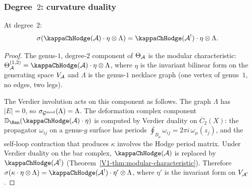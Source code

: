 \subsubsection{Degree~$2$: curvature duality}

\begin{proposition}
\label{prop:thqg-IV-kappa-duality}
At degree~$2$:
\begin{equation}%
\sigma(\kappaChHodge(\cA) \cdot \eta \otimes \Lambda)
= \kappaChHodge(\cA^!) \cdot \eta \otimes \Lambda.
\end{equation}
\end{proposition}

\begin{proof}
The genus-$1$, degree-$2$ component of $\Theta_{\mathcal{A}}$ is the modular
characteristic:
$\Theta_\cA^{(1,2)} = \kappaChHodge(\cA) \cdot \eta \otimes \Lambda$,
where $\eta$ is the invariant bilinear form on the generating
space $V_{\mathcal{A}}$ and $\Lambda$ is the genus-$1$ necklace graph
(one vertex of genus~$1$, no edges, two legs).

The Verdier involution acts on this component as follows.
The graph $\Lambda$ has $|E| = 0$, so
$\sigma_{\mathcal{G}^{\mathrm{mod}}}(\Lambda) = \Lambda$.
The deformation complex component $\VD_{\Ran}(\kappaChHodge(\cA) \cdot \eta)$
is computed by Verdier duality on $\overline{C}_2(X)$:
the propagator $\omega_{ij}$ on a genus-$g$ surface has periods
$\oint_{B_\mu} \omega_{ij} = 2\pi i\,\omega_\mu(z_j)$, and the
self-loop contraction that produces $\kappa$ involves the Hodge period
matrix. Under Verdier duality on the bar complex,
$\kappaChHodge(\cA)$ is replaced by $\kappaChHodge(\cA^!)$
(Theorem~\ref{V1-thm:modular-characteristic}). Therefore
$\sigma(\kappa \cdot \eta \otimes \Lambda)
= \kappaChHodge(\cA^!) \cdot \eta' \otimes \Lambda$,
where $\eta'$ is the invariant form on $V_{\mathcal{A}^!}$.
\end{proof}

